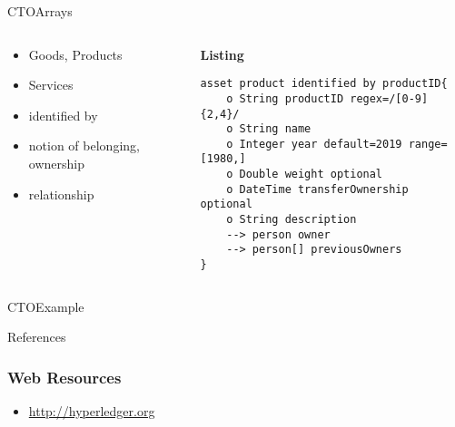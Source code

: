 \documentclass[pdf,table]{beamer}
\begin{document}
\begin{frame}[fragile]{CTO}{Arrays}
	\begin{columns}[T]
		\begin{column}{0.48\textwidth}
			\begin{itemize}
				\item Goods, Products
				\item Services 
				\item identified by
				\item notion of belonging, ownership 
				\item relationship 
			\end{itemize}	
		\end{column}
		\begin{column}{0.48\textwidth}
			{\bf Listing}
\begin{lstlisting}[language=CTO]
asset product identified by productID{
	o String productID regex=/[0-9]{2,4}/
	o String name 
	o Integer year default=2019 range=[1980,]
	o Double weight optional
	o DateTime transferOwnership optional
	o String description 
	--> person owner
	--> person[] previousOwners
}
			\end{lstlisting}
		\end{column}
	\end{columns}	
\end{frame}
	
\begin{frame}{CTO}{Example}
	
	
\end{frame}


\begin{frame}[allowframebreaks]{References}
	\printbibliography
\end{frame}
	
\begin{frame}
	\frametitle{Web Resources}
	\begin{itemize}
	\item \url{http://hyperledger.org}
	\end{itemize}
\end{frame}
\end{document}
